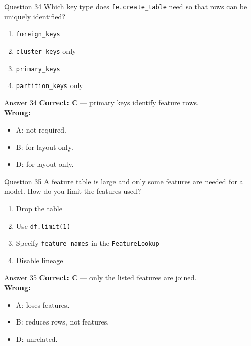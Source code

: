 \documentclass[aspectratio=169,11pt]{beamer}
\begin{document}
\begin{frame}{Question 34}
Which key type does \texttt{fe.create\_table} need so that rows can be uniquely identified?
\begin{enumerate}[label=\Alph*.]
\item \texttt{foreign\_keys}
\item \texttt{cluster\_keys} only
\item \texttt{primary\_keys}
\item \texttt{partition\_keys} only
\end{enumerate}
\end{frame}
\begin{frame}{Answer 34}
\textbf{Correct: C} --- primary keys identify feature rows.\\
\vspace{0.5em}
\textbf{Wrong:}
\begin{itemize}
\item A: not required.
\item B: for layout only.
\item D: for layout only.
\end{itemize}
\end{frame}

\begin{frame}{Question 35}
A feature table is large and only some features are needed for a model. How do you limit the features used?
\begin{enumerate}[label=\Alph*.]
\item Drop the table
\item Use \texttt{df.limit(1)}
\item Specify \texttt{feature\_names} in the \texttt{FeatureLookup}
\item Disable lineage
\end{enumerate}
\end{frame}
\begin{frame}{Answer 35}
\textbf{Correct: C} --- only the listed features are joined.\\
\vspace{0.5em}
\textbf{Wrong:}
\begin{itemize}
\item A: loses features.
\item B: reduces rows, not features.
\item D: unrelated.
\end{itemize}
\end{frame}
\end{document}

